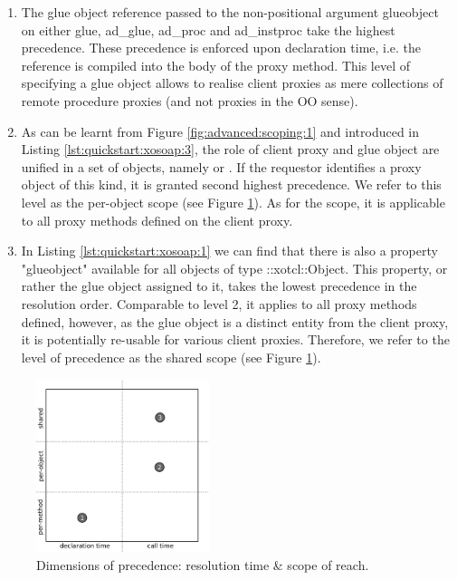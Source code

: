 \begin{enumerate}
\item The glue object reference passed to the non-positional argument glueobject on either glue, ad\_glue, ad\_proc and ad\_instproc take the highest precedence. These precedence is enforced upon declaration time, i.e. the reference is compiled into the body of the proxy method. This level of specifying a glue object allows to realise client proxies as mere collections of remote procedure proxies (and not proxies in the OO sense).
\item As can be learnt from Figure \ref{fig:advanced:scoping:1} and introduced in Listing \ref{lst:quickstart:xosoap:3}, the role of client proxy and glue object are unified in a set of objects, namely  or  . If the requestor identifies a proxy object of this kind, it is granted second highest precedence. We refer to this level as the per-object scope (see Figure \ref{fig:advanced:scoping:2}). As for the scope, it is applicable to all proxy methods defined on the client proxy.
\item In Listing \ref{lst:quickstart:xosoap:1} we can find that there is also a property "glueobject" available for all objects of type ::xotcl::Object. This property, or rather the glue object assigned to it, takes the lowest precedence in the resolution order. Comparable to level 2, it applies to all proxy methods defined, however, as the glue object is a distinct entity from the client proxy, it is potentially re-usable for various client proxies. Therefore, we refer to the level of precedence as the shared scope (see Figure \ref{fig:advanced:scoping:2}).
\end{enumerate}
  \begin{figure}[htbp]
\begin{center}
\includegraphics[width=0.45\textwidth]{img/scoping-glue-objects-scheme.png}
\caption{Dimensions of precedence: resolution time \& scope of reach.}
\label{fig:advanced:scoping:2}
\end{center}
\end{figure}
